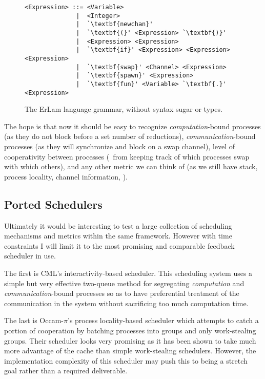 \begin{figure} %
\centering
\begin{BVerbatim}[commandchars=\\\{\}]
<Expression> ::= <Variable> 
              |  <Integer>
              |  `\textbf{newchan}'
              |  `\textbf{(}' <Expression> `\textbf{)}'
              |  <Expression> <Expression>
              |  `\textbf{if}' <Expression> <Expression> <Expression>
              |  `\textbf{swap}' <Channel> <Expression>
              |  `\textbf{spawn}' <Expression>
              |  `\textbf{fun}' <Variable> `\textbf{.}' <Expression>
\end{BVerbatim}
\caption{The ErLam language grammar, without syntax sugar or types.}
\label{fig:grammer}
\end{figure}

The hope is that now it should be easy to recognize {\em computation}-bound processes (as they do not block
before a set number of reductions), {\em communication}-bound processes (as they will synchronize and block
on a swap channel), level of cooperativity between processes (\ie~from keeping track of which processes swap with
which others), and any other metric we can think of (as we still have stack, process locality, channel
information, \etc).


\subsection{Ported Schedulers}
\label{sec:schedwork}

Ultimately it would be interesting to test a large collection of scheduling mechanisms and metrics within the same 
framework. However with time constraints I will limit it to the most promising and comparable feedback scheduler
in use.

The first is CML's interactivity-based scheduler. 
This scheduling system uses a simple but very effective two-queue method for segregating {\em computation} and 
{\em communication}-bound processes so as to have preferential treatment of the communication in the system without
sacrificing too much computation time.

The last is Occam-$\pi$'s process locality-based scheduler which attempts to catch a portion of cooperation by
batching processes into groups and only work-stealing groups. Their scheduler looks very promising as it has 
been shown to take much more advantage of the cache than simple work-stealing schedulers. However, the implementation
complexity of this scheduler may push this to being a stretch goal rather than a required deliverable.

